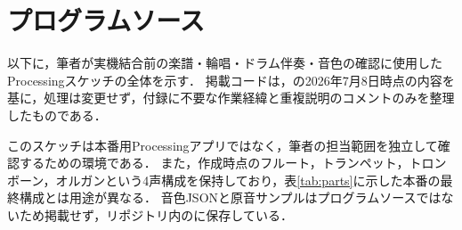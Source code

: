 \documentclass[uplatex,dvipdfmx]{jlreq}
\begin{document}
\section{プログラムソース}
以下に，筆者が実機結合前の楽譜・輪唱・ドラム伴奏・音色の確認に使用したProcessingスケッチの全体を示す．
掲載コードは，の2026年7月8日時点の内容を基に，処理は変更せず，付録に不要な作業経緯と重複説明のコメントのみを整理したものである．

このスケッチは本番用Processingアプリではなく，筆者の担当範囲を独立して確認するための環境である．
また，作成時点のフルート，トランペット，トロンボーン，オルガンという4声構成を保持しており，表\ref{tab:parts}に示した本番の最終構成とは用途が異なる．
音色JSONと原音サンプルはプログラムソースではないため掲載せず，リポジトリ内のに保存している．


\end{document}
